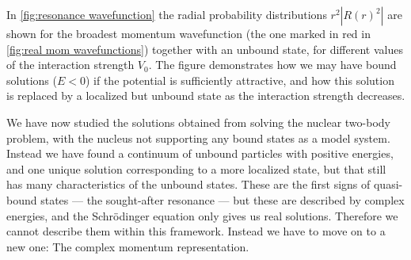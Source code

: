 \documentclass[../main/report.tex]{subfiles}
\begin{document}
In \cref{fig:resonance wavefunction} the radial probability distributions $r^2|R(r)^2|$ are shown for the broadest momentum wavefunction (the one marked in red in \cref{fig:real mom wavefunctions}) together with an unbound state, for different values of the interaction strength $V_0$. The figure demonstrates how we may have bound solutions ($E<0$) if the potential is sufficiently attractive, and how this solution is replaced by a localized but unbound state as the interaction strength decreases. 


We have now studied the solutions obtained from solving the nuclear two-body problem, with the  nucleus not supporting any bound states as a model system. Instead we have found a continuum of unbound particles with positive energies, and one unique solution corresponding to a more localized state, but that still has many characteristics of the unbound states. These are the first signs of quasi-bound states --- the sought-after resonance --- but these are described by complex energies, and the Schrödinger equation only gives us real solutions. Therefore we cannot describe them within this framework. Instead we have to move on to a new one: The complex momentum representation. 



\end{document}
